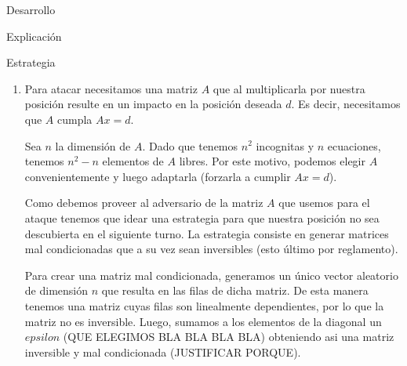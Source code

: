 \begin{section}{Desarrollo}
\begin{subsection}{Explicación}
\begin{subsubsection}{Estrategia}
\begin{enumerate}
\begin{itemize}
					Elegimos este método ya que las matrices son cuadradas y la implementación es sencilla.\\
					PONER MAS MOTIVOS COMO COMPLEJIDAD!!!!!!!!!!!!!!!!!!!!!!!!!!!!!!!!!!!!!!!!!!!!!!!!!!!!\\
				\end{itemize}
			
				La exactitud con la que la calculemos la posición buscada $y$ depende del número de condición de la matriz $A'$, y de este calculo entre otras cosas depende la exactitud de nuestro disparo.\\
				
				Como creemos que el adversario va a utilizar matrices mal condicionadas para atacarnos, en cada turno estariamos calculando una posición errada de donde se encuentra. Por este motivo, decidimos usar la estrategia de disparar en el punto promedio de todos las posiciones calculadas hasta el momento de donde se situa. Esperamos de esta manera ir obteniendo cada vez mejores aproximaciones a donde se encuentra realmente.
			
			
			\item Para atacar necesitamos una matriz $A$ que al multiplicarla por nuestra posición resulte en un impacto en la posición deseada $d$. Es decir, necesitamos que $A$ cumpla $Ax=d$.
			
			Sea $n$ la dimensión de $A$.
			Dado que tenemos $n^2$ incognitas y $n$ ecuaciones, tenemos $n^2-n$ elementos de $A$ libres. Por este motivo, podemos elegir $A$ convenientemente y luego adaptarla (forzarla a cumplir $Ax=d$).			
			
			Como debemos proveer al adversario de la matriz $A$ que usemos para el ataque tenemos que idear una estrategia para que nuestra posición no sea descubierta en el siguiente turno. La estrategia consiste en generar matrices mal condicionadas que a su vez sean inversibles (esto último por reglamento).
			
			Para crear una matriz mal condicionada, generamos un único vector aleatorio de dimensión $n$ que resulta en las filas de dicha matriz. De esta manera tenemos una matriz cuyas filas son linealmente dependientes, por lo que la matriz no es inversible. Luego, sumamos a los elementos de la diagonal un $epsilon$ (QUE ELEGIMOS BLA BLA BLA BLA) obteniendo asi una matriz inversible y mal condicionada (JUSTIFICAR PORQUE).
			

\end{enumerate}
\end{subsubsection}
\end{subsection}
\end{section}

